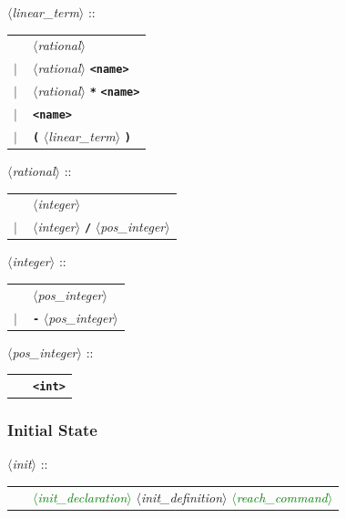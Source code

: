 \documentclass[a4paper,10pt]{article}
\newcommand{\nt}[1]{$\langle$\emph{#1}$\rangle$}
\newcommand{\regleGrammaire}[1]{\bigskip \noindent \nt{#1} :: \\}
\newcommand{\npec}[1]{\textcolor{green}{#1}}
\newcommand{\code}[1]{\textbf{\texttt{#1}}}
\begin{document}
\regleGrammaire{linear\_term}
\begin{tabular}{l l}
	\  & \nt{rational} \\
	$|$ & \nt{rational} \code{<name>} \\
	$|$ & \nt{rational} \code{*} \code{<name>} \\
	$|$ & \code{<name>} \\
	$|$ & \code{(} \nt{linear\_term} \code{)} \\
\end{tabular}

\regleGrammaire{rational}
\begin{tabular}{l l}
	\  & \nt{integer} \\
	$|$ & \nt{integer} \code{/} \nt{pos\_integer}  \\
\end{tabular}

\regleGrammaire{integer}
\begin{tabular}{l l}
	\  & \nt{pos\_integer} \\
	$|$ & \code{-} \nt{pos\_integer}  \\
\end{tabular}

\regleGrammaire{pos\_integer}
\begin{tabular}{l l}
	\  & \code{<int>} \\
\end{tabular}




\subsubsection{Initial State}

\regleGrammaire{init}
\begin{tabular}{l l}
	\  & \npec{\nt{init\_declaration}} \nt{init\_definition} \npec{\nt{reach\_command}} \\
\end{tabular}
\end{document}
